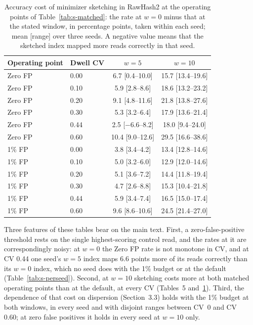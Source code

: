 \documentclass[11pt,a4paper]{article}
\begin{document}
\begin{table}[htbp]
\centering
\caption{Accuracy cost of minimizer sketching in RawHash2 at the operating points of
Table~\ref{tab:s-matched}: the rate at $w = 0$ minus that at the stated window, in percentage
points, taken within each seed; mean [range] over three seeds. A negative value means that the
sketched index mapped more reads correctly in that seed.}
\label{tab:s-matched-cost}
\begin{tabular}{llcc}
\toprule
Operating point & Dwell CV & $w = 5$ & $w = 10$ \\
\midrule
Zero FP & 0.00 & 6.7 [0.4--10.0] & 15.7 [13.4--19.6] \\
Zero FP & 0.10 & 5.9 [2.8--8.6] & 18.6 [13.2--23.2] \\
Zero FP & 0.20 & 9.1 [4.8--11.6] & 21.8 [13.8--27.6] \\
Zero FP & 0.30 & 5.3 [3.2--6.4] & 17.9 [13.6--21.4] \\
Zero FP & 0.44 & 2.5 [$-$6.6--8.2] & 18.0 [9.4--24.0] \\
Zero FP & 0.60 & 10.4 [9.0--12.6] & 29.5 [16.6--38.6] \\
\midrule
1\% FP & 0.00 & 3.8 [3.4--4.2] & 13.4 [12.8--14.6] \\
1\% FP & 0.10 & 5.0 [3.2--6.0] & 12.9 [12.0--14.6] \\
1\% FP & 0.20 & 5.1 [3.6--7.2] & 14.4 [11.8--19.4] \\
1\% FP & 0.30 & 4.7 [2.6--8.8] & 15.3 [10.4--21.8] \\
1\% FP & 0.44 & 5.9 [3.4--7.4] & 16.5 [15.0--17.4] \\
1\% FP & 0.60 & 9.6 [8.6--10.6] & 24.5 [21.4--27.0] \\
\bottomrule
\end{tabular}
\end{table}

Three features of these tables bear on the main text. First, a zero-false-positive threshold rests
on the single highest-scoring control read, and the rates at it are correspondingly noisy: at
$w = 0$ the Zero FP rate is not monotone in CV, and at CV 0.44 one seed's $w = 5$ index maps
6.6 points more of its reads correctly than its $w = 0$ index, which no seed does with the 1\% budget
or at the default (Table~\ref{tab:s-perseed}). Second, at $w = 10$ sketching costs more at both
matched operating points than at the default, at every CV (Tables~5 and~\ref{tab:s-matched-cost}).
Third, the dependence of that cost on dispersion (Section~3.3) holds with the 1\% budget at both
windows, in every seed and with disjoint ranges between CV~0 and CV 0.60; at zero false positives it
holds in every seed at $w = 10$ only.
\end{document}
